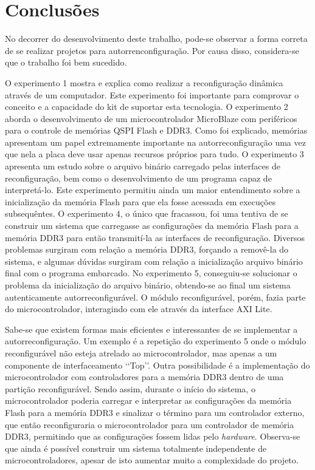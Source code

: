 ﻿%
                      

\chapter{Conclus\~{o}es}\label{CapConclusoes}
No decorrer do desenvolvimento deste trabalho, pode-se observar a forma correta de se realizar projetos para autorrenconfiguração.
Por causa disso, considera-se que o trabalho foi bem sucedido.

O experimento 1 mostra e explica como realizar a reconfiguração dinâmica através de um computador.
Este experimento foi importante para comprovar o conceito e a capacidade do kit de suportar esta tecnologia.
O experimento 2 aborda o desenvolvimento de um microcontrolador MicroBlaze com periféricos para o controle de memórias QSPI Flash e DDR3.
Como foi explicado, memórias apresentam um papel extremamente importante na autorreconfiguração uma vez que nela a placa deve usar apenas recursos próprios para tudo.
O experimento 3 apresenta um estudo sobre o arquivo binário carregado pelas interfaces de reconfiguração, bem como o desenvolvimento de um programa capaz de interpretá-lo.
Este experimento permitiu ainda um maior entendimento sobre a inicialização da memória Flash para que ela fosse acessada em execuções subsequêntes.
O experimento 4, o único que fracassou, foi uma tentiva de se construir um sistema que carregasse as configurações da memória Flash para a memória DDR3 para então transmití-la as interfaces de reconfiguração.
Diversos problemas surgiram com relação a memória DDR3, forçando a removê-la do sistema, e algumas dúvidas surgiram com relação a inicialização arquivo binário final com o programa embarcado.
No experimento 5, conseguiu-se solucionar o problema da inicialização do arquivo binário, obtendo-se ao final um sistema autenticamente autorreconfigurável.
O módulo reconfigurável, porém, fazia parte do microcontrolador, interagindo com ele através da interface AXI Lite.

Sabe-se que existem formas mais eficientes e interessantes de se implementar a autorreconfiguração.
Um exemplo é a repetição do experimento 5 onde o módulo reconfigurável não esteja atrelado ao microcontrolador, mas apenas a um componente de interfaceamento \lq\lq{}Top\rq\rq{}.
Outra possibilidade é a implementação do microcontrolador com controladores para a memória DDR3 dentro de uma partição reconfigurável.
Sendo assim, durante o início do sistema, o microcontrolador poderia carregar e interpretar as configurações da memória Flash para a memória DDR3 e sinalizar o término para um controlador externo, que então reconfiguraria o microcontrolador para um controlador de memória DDR3, permitindo que as configurações fossem lidas pelo \textit{hardware}.
Observa-se que ainda é possível construir um sistema totalmente independente de microcontroladores, apesar de isto aumentar muito a complexidade do projeto.